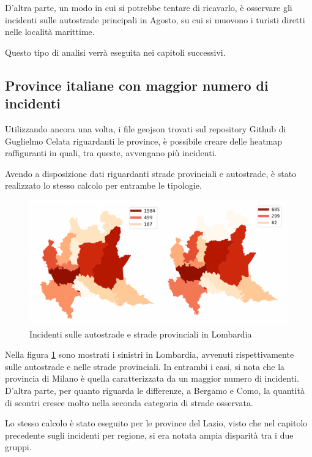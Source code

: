 \documentclass[a4paper,12pt]{report}
\begin{document}
D'altra parte, un modo in cui si potrebbe tentare di ricavarlo, è osservare gli 
incidenti sulle autostrade principali in Agosto, su cui si muovono i turisti diretti 
nelle località marittime. 

Questo tipo di analisi verrà eseguita nei capitoli successivi. 

\subsection{Province italiane con maggior numero di incidenti}

Utilizzando ancora una volta, i file geojson trovati sul repository Github di 
Guglielmo Celata riguardanti le province, 
è possibile creare delle heatmap raffiguranti in quali, tra queste, avvengano più 
incidenti. 

Avendo a disposizione dati riguardanti strade provinciali e autostrade, 
è stato realizzato lo stesso calcolo per entrambe le tipologie. 

\begin{figure}
    \includegraphics[width=\linewidth]{img_unite/lombardia_autostrade_provinciali.png}
    \caption{Incidenti sulle autostrade e strade provinciali in Lombardia}
    \label{fig:lombardia-strade}
\end{figure}

Nella figura \ref{fig:lombardia-strade} sono mostrati i sinistri in Lombardia, 
avvenuti rispettivamente sulle autostrade e nelle strade provinciali. 
In entrambi i casi, si nota che la provincia di Milano è quella caratterizzata da 
un maggior numero di incidenti. 
D'altra parte, per quanto riguarda le differenze, a Bergamo e Como, 
la quantità di scontri cresce molto nella seconda categoria di strade osservata. 

Lo stesso calcolo è stato eseguito per le province del Lazio, visto che nel capitolo 
precedente sugli incidenti per regione, si era notata ampia disparità tra i due gruppi. 
\end{document}
